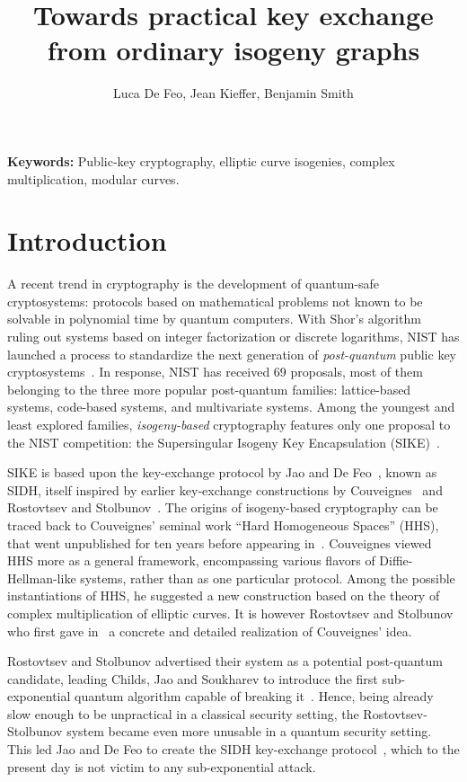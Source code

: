 \documentclass{article}
\title{Towards practical key exchange from ordinary isogeny graphs}
\author{Luca De Feo, Jean Kieffer, Benjamin Smith}
\theoremstyle{definition}
\begin{document}
\maketitle

\begin{abstract}
\end{abstract}

\textbf{Keywords:} Public-key cryptography, elliptic curve isogenies,
complex multiplication, modular curves.

\section{Introduction}
\label{sec:introduction}

A recent trend in cryptography is the development of quantum-safe
cryptosystems: protocols based on mathematical problems not known to
be solvable in polynomial time by quantum computers. With Shor's
algorithm~\cite{shor1994algorithms} ruling out systems based on
integer factorization or discrete logarithms, NIST has launched a
process to standardize the next generation of \emph{post-quantum}
public key cryptosystems~\cite{NIST2016}. In response, NIST has
received 69 proposals, most of them belonging to the three more
popular post-quantum families: lattice-based systems, code-based
systems, and multivariate systems. Among the youngest and least
explored families, \emph{isogeny-based} cryptography features only one
proposal to the NIST competition: the Supersingular Isogeny Key
Encapsulation (SIKE)~\cite{SIKE}.

SIKE is based upon the key-exchange protocol by Jao and De
Feo~\cite{jao+defeo2011}, known as SIDH, itself inspired by earlier
key-exchange constructions by Couveignes~\cite{cryptoeprint:2006:291}
and Rostovtsev and
Stolbunov~\cite{rostovtsev+stolbunov06,stolbunov-red,Stol}. The
origins of isogeny-based cryptography can be traced back to
Couveignes' seminal work ``Hard Homogeneous Spaces'' (HHS), that went
unpublished for ten years before appearing
in~\cite{cryptoeprint:2006:291}. Couveignes viewed HHS more as a
general framework, encompassing various flavors of Diffie-Hellman-like
systems, rather than as one particular protocol. Among the possible
instantiations of HHS, he suggested a new construction based on the
theory of complex multiplication of elliptic curves. It is however
Rostovtsev and Stolbunov who first gave
in~\cite{rostovtsev+stolbunov06} a concrete and detailed realization
of Couveignes' idea.

Rostovtsev and Stolbunov advertised their system as a potential
post-quantum candidate, leading Childs, Jao and Soukharev to introduce
the first sub-exponential quantum algorithm capable of breaking
it~\cite{childs2014constructing}. Hence, being already slow enough to
be unpractical in a classical security setting, the
Rostovtsev-Stolbunov system became even more unusable in a quantum
security setting. This led Jao and De Feo to create the SIDH
key-exchange protocol~\cite{jao+defeo2011}, which to the present day
is not victim to any sub-exponential attack.
\end{document}
